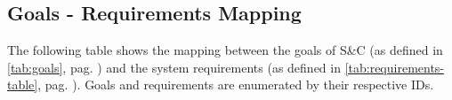 \subsection{Goals - Requirements Mapping}

The following table shows the mapping between the goals of S\&C (as defined in \ref{tab:goals}, pag. \pageref{tab:goals})
and the system requirements (as defined in \ref{tab:requirements-table}, pag. \pageref{tab:requirements-table}). Goals
and requirements are enumerated by their respective IDs.

